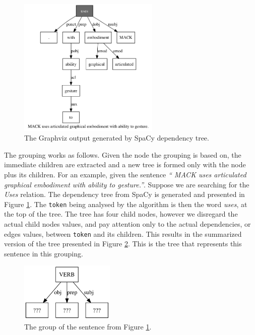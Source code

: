 \documentclass[11pt,a4paper,openright]{memoir}
\begin{document}
\begin{figure}[!htbp]
  \centering
    \includegraphics[width=0.6\textwidth]{./images/sentence-91-37}
  \caption[The Graphviz output generated by SpaCy dependency tree.]{The Graphviz output generated by SpaCy dependency tree.}
  \label{fig:tree_output}
\end{figure}

The grouping works as follows. Given the node the grouping is based on, the immediate children are extracted and a new tree is formed only with the node plus its children. For an example, given the sentence \emph{\enquote{	MACK uses articulated graphical embodiment with ability to gesture.}}. Suppose we are searching for the \emph{Uses} relation. The dependency tree from SpaCy is generated and presented in Figure \ref{fig:tree_output}. The \texttt{token} being analysed by the algorithm is then the word \emph{uses}, at the top of the tree. The tree has four child nodes, however we disregard the actual child nodes values, and pay attention only to the actual dependencies, or edges values, between \texttt{token} and its children. This results in the summarized version of the tree presented in Figure \ref{fig:group_output_2}. This is the tree that represents this sentence in this grouping.

\begin{figure}[!htbp]
  \centering
    \includegraphics[width=0.4\textwidth]{./images/command-simplified-group-uses-3}
  \caption[The group of the sentence.]{The group of the sentence from Figure \ref{fig:tree_output}.}
  \label{fig:group_output_2}
\end{figure}
\end{document}
